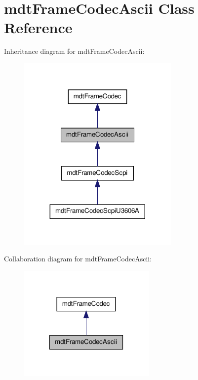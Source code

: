 \hypertarget{classmdt_frame_codec_ascii}{
\section{mdtFrameCodecAscii Class Reference}
\label{classmdt_frame_codec_ascii}
}


Inheritance diagram for mdtFrameCodecAscii:\nopagebreak
\begin{figure}[H]
\begin{center}
\leavevmode
\includegraphics[width=224pt]{classmdt_frame_codec_ascii__inherit__graph}
\end{center}
\end{figure}


Collaboration diagram for mdtFrameCodecAscii:\nopagebreak
\begin{figure}[H]
\begin{center}
\leavevmode
\includegraphics[width=190pt]{classmdt_frame_codec_ascii__coll__graph}
\end{center}
\end{figure}
